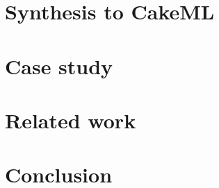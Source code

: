 \documentclass[global,twocolumn]{svjour}
\begin{document}
\section{Synthesis to CakeML}
\label{sec:synthesis}


\section{Case study}
\label{sec:case-study}


\section{Related work}
\label{sec:related-work}


\section{Conclusion}
\label{sec:conclusion}


\clearpage


\end{document}

